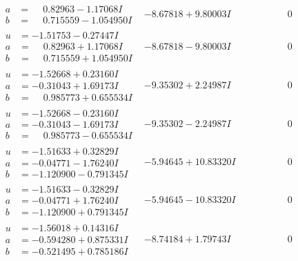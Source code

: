 \documentclass[1p]{elsarticle_modified}
\theoremstyle{definition}
\begin{document}
$$\begin{array}{c|c|c}
\begin{aligned}
a &= \phantom{-}0.82963 - 1.17068 I \\
b &= \phantom{-}0.715559 - 1.054950 I\end{aligned}
 & -8.67818 + 9.80003 I & \phantom{-0.000000 } 0 \\ \hline\begin{aligned}
u &= -1.51753 - 0.27447 I \\
a &= \phantom{-}0.82963 + 1.17068 I \\
b &= \phantom{-}0.715559 + 1.054950 I\end{aligned}
 & -8.67818 - 9.80003 I & \phantom{-0.000000 } 0 \\ \hline\begin{aligned}
u &= -1.52668 + 0.23160 I \\
a &= -0.31043 + 1.69173 I \\
b &= \phantom{-}0.985773 + 0.655534 I\end{aligned}
 & -9.35302 + 2.24987 I & \phantom{-0.000000 } 0 \\ \hline\begin{aligned}
u &= -1.52668 - 0.23160 I \\
a &= -0.31043 - 1.69173 I \\
b &= \phantom{-}0.985773 - 0.655534 I\end{aligned}
 & -9.35302 - 2.24987 I & \phantom{-0.000000 } 0 \\ \hline\begin{aligned}
u &= -1.51633 + 0.32829 I \\
a &= -0.04771 - 1.76240 I \\
b &= -1.120900 - 0.791345 I\end{aligned}
 & -5.94645 + 10.83320 I & \phantom{-0.000000 } 0 \\ \hline\begin{aligned}
u &= -1.51633 - 0.32829 I \\
a &= -0.04771 + 1.76240 I \\
b &= -1.120900 + 0.791345 I\end{aligned}
 & -5.94645 - 10.83320 I & \phantom{-0.000000 } 0 \\ \hline\begin{aligned}
u &= -1.56018 + 0.14316 I \\
a &= -0.594280 + 0.875331 I \\
b &= -0.521495 + 0.785186 I\end{aligned}
 & -8.74184 + 1.79743 I & \phantom{-0.000000 } 0 \\ \hline\begin{aligned}

\end{aligned}
\end{array}$$
\end{document}
